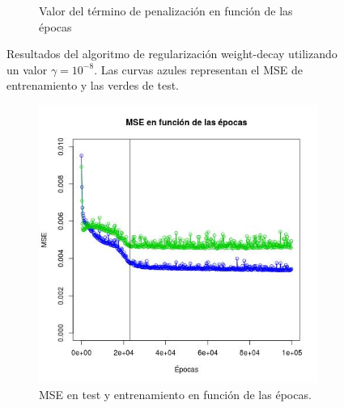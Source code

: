 \documentclass[12pt, a4paper]{article}
\begin{document}
\begin{figure}
\begin{subfigure}[b]{0.45\textwidth}
        \caption{Valor del término de penalización en función de las épocas}
    \end{subfigure}
    \caption{Resultados del algoritmo de regularización weight-decay utilizando un valor $\gamma = 10^{-8}$. Las curvas azules representan el MSE de entrenamiento y las verdes de test.}
\end{figure}



 \begin{figure}
    \centering

    \begin{subfigure}[b]{0.45\textwidth}
        \includegraphics[width=\textwidth]{ejercicioD2}
		\caption{MSE en test y entrenamiento en función de las épocas. }
    \end{subfigure}
      ~ %
    \begin{subfigure}[b]{0.45\textwidth}

\end{subfigure}
\end{figure}
\end{document}
